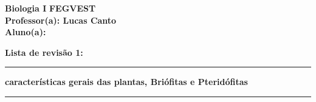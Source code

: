 \documentclass[12pt,a4paper]{exam}
\begin{document}
\noindent
\textbf{Biologia I}  \hfill \textbf{FEGVEST} \\[0.4cm]
\textbf{Professor(a): Lucas Canto} \\[0.4cm]
\textbf{Aluno(a):}  \\[0.4cm]

\begin{center}
    {\Large \textbf{Lista de revisão 1:}} \\[0.2cm]
    \rule{\textwidth}{0.5pt}
\end{center}
\begin{center}
    {\Large \textbf{ características gerais das plantas, Briófitas e Pteridófitas}} \\[0.2cm]
    \rule{\textwidth}{0.5pt}
\end{center}

\vspace{0.5cm}
\end{document}

